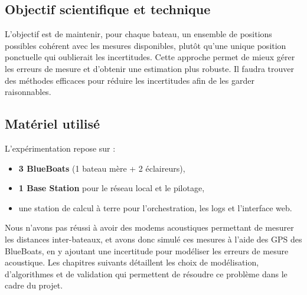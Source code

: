 \subsection{Objectif scientifique et technique}

L'objectif est de maintenir, pour chaque bateau, un ensemble de positions possibles cohérent avec les mesures disponibles, plutôt qu'une unique position ponctuelle qui oublierait les incertitudes. Cette approche permet de mieux gérer les erreurs de mesure et d'obtenir une estimation plus robuste. Il faudra trouver des méthodes efficaces pour réduire les incertitudes afin de les garder raisonnables.

\subsection{Matériel utilisé}

L'expérimentation repose sur :
\begin{itemize}
	\item \textbf{3 BlueBoats} (1 bateau mère + 2 éclaireurs),
	\item \textbf{1 Base Station} pour le réseau local et le pilotage,
	\item une station de calcul à terre pour l'orchestration, les logs et l'interface web.
\end{itemize}

\medskip

Nous n'avons pas réussi à avoir des modems acoustiques permettant de mesurer les distances inter-bateaux, et avons donc simulé ces mesures à l'aide des GPS des BlueBoats, en y ajoutant une incertitude pour modéliser les erreurs de mesure acoustique. Les chapitres suivants détaillent les choix de modélisation, d'algorithmes et de validation qui permettent de résoudre ce problème dans le cadre du projet.